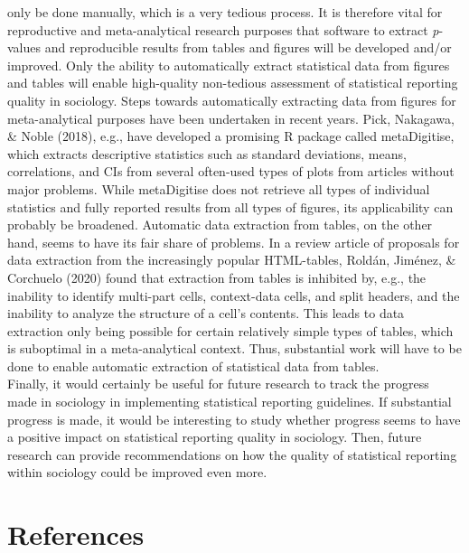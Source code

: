 \documentclass[
  12pt,
]{article}
\begin{document}
only be done manually, which is a very tedious process. It is therefore
vital for reproductive and meta-analytical research purposes that
software to extract \emph{p}-values and reproducible results from tables
and figures will be developed and/or improved. Only the ability to
automatically extract statistical data from figures and tables will
enable high-quality non-tedious assessment of statistical reporting
quality in sociology. Steps towards automatically extracting data from
figures for meta-analytical purposes have been undertaken in recent
years. Pick, Nakagawa, \& Noble (2018), e.g., have developed a promising
R package called metaDigitise, which extracts descriptive statistics
such as standard deviations, means, correlations, and CIs from several
often-used types of plots from articles without major problems. While
metaDigitise does not retrieve all types of individual statistics and
fully reported results from all types of figures, its applicability can
probably be broadened. Automatic data extraction from tables, on the
other hand, seems to have its fair share of problems. In a review
article of proposals for data extraction from the increasingly popular
HTML-tables, Roldán, Jiménez, \& Corchuelo (2020) found that extraction
from tables is inhibited by, e.g., the inability to identify multi-part
cells, context-data cells, and split headers, and the inability to
analyze the structure of a cell's contents. This leads to data
extraction only being possible for certain relatively simple types of
tables, which is suboptimal in a meta-analytical context. Thus,
substantial work will have to be done to enable automatic extraction of
statistical data from tables.\\
\hspace*{0.333em}\hspace*{0.333em}\hspace*{0.333em}\hspace*{0.333em}Finally,
it would certainly be useful for future research to track the progress
made in sociology in implementing statistical reporting guidelines. If
substantial progress is made, it would be interesting to study whether
progress seems to have a positive impact on statistical reporting
quality in sociology. Then, future research can provide recommendations
on how the quality of statistical reporting within sociology could be
improved even more.

\pagebreak

\hypertarget{references}{%
\section{References}\label{references}}
\end{document}
